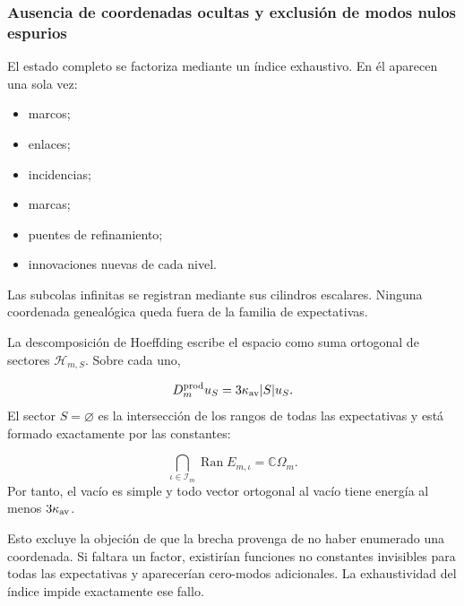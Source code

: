 \subsubsection{Ausencia de coordenadas ocultas y exclusión de modos nulos espurios}
El estado completo se factoriza mediante un índice exhaustivo. En él aparecen una sola vez:\par
\begin{itemize}
\item marcos;
\item enlaces;
\item incidencias;
\item marcas;
\item puentes de refinamiento;
\item innovaciones nuevas de cada nivel.
\end{itemize}
Las subcolas infinitas se registran mediante sus cilindros escalares. Ninguna coordenada genealógica queda fuera de la familia de expectativas.\par
La descomposición de Hoeffding escribe el espacio como suma ortogonal de sectores \(\mathcal H_{m,S}\). Sobre cada uno,\par
\[
D_m^{\rm prod}u_S
=
3\kappa_{\rm av}|S|u_S.
\]
El sector \(S=\varnothing\) es la intersección de los rangos de todas las expectativas y está formado exactamente por las constantes:\par
\[
\bigcap_{\iota\in\mathcal I_m}
\operatorname{Ran}E_{m,\iota}
=
\mathbb C\Omega_m.
\]
Por tanto, el vacío es simple y todo vector ortogonal al vacío tiene energía al menos \(3\kappa_{\rm av}\).\par
Esto excluye la objeción de que la brecha provenga de no haber enumerado una coordenada. Si faltara un factor, existirían funciones no constantes invisibles para todas las expectativas y aparecerían cero-modos adicionales. La exhaustividad del índice impide exactamente ese fallo.\par
{}
